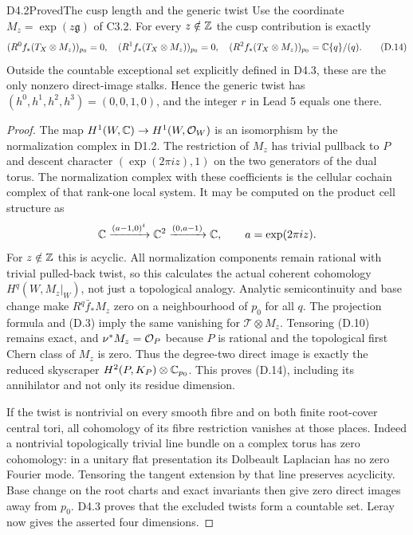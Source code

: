 \begin{claim}{D4.2}{Proved}{The cusp length and the generic twist}
Use the coordinate $M_z=\exp(z\mathfrak g)$ of C3.2. For every
$z\notin\mathbb Z$ the cusp contribution is exactly
\[
 (R^0f_*(T_X\otimes M_z))_{p_0}=0,\quad
 (R^1f_*(T_X\otimes M_z))_{p_0}=0,\quad
 (R^2f_*(T_X\otimes M_z))_{p_0}=\mathbb C\{q\}/(q).           \tag{D.14}
\]
Outside the countable exceptional set explicitly defined in D4.3,
these are the only nonzero direct-image stalks. Hence the generic
twist has $(h^0,h^1,h^2,h^3)=(0,0,1,0)$, and the integer $r$ in
Lead 5 equals one there.
\end{claim}
\begin{proof}
The map $H^1(W,\mathbb C)\to H^1(W,\mathcal O_W)$ is an isomorphism by the
normalization complex in D1.2. The restriction of $M_z$ has trivial
pullback to $P$ and descent character
$(\exp(2\pi iz),1)$ on the two generators of the dual torus. The
normalization complex with these coefficients is the cellular
cochain complex of that rank-one local system. It may be computed
on the product cell structure as
\[
 \mathbb C\xrightarrow{(a-1,0)^t}\mathbb C^2
 \xrightarrow{(0,a-1)}\mathbb C,
 \qquad a=\exp(2\pi iz).
\]
For $z\notin\mathbb Z$ this is acyclic. All normalization components remain
rational with trivial pulled-back twist, so this calculates the
actual coherent cohomology $H^q(W,M_z|_W)$, not just a topological
analogy. Analytic semicontinuity and base change make
$R^q\bar f_*M_z$ zero on a neighbourhood of $p_0$ for all $q$.
The projection formula and (D.3) imply the same vanishing for
$\mathcal T\otimes M_z$. Tensoring (D.10) remains exact, and
$\nu^*M_z=\mathcal O_P$ because $P$ is rational and the topological first
Chern class of $M_z$ is zero. Thus the degree-two direct image is
exactly the reduced skyscraper $H^2(P,K_P)\otimes\mathbb C_{p_0}$.
This proves (D.14), including its annihilator and not only its residue
dimension.

If the twist is nontrivial on every smooth fibre and on both finite
root-cover central tori, all cohomology of its fibre restriction
vanishes at those places. Indeed a nontrivial topologically trivial
line bundle on a complex torus has zero cohomology: in a unitary flat
presentation its Dolbeault Laplacian has no zero Fourier mode.
Tensoring the tangent extension by that line preserves acyclicity.
Base change on the root charts and exact invariants then give zero
direct images away from $p_0$. D4.3 proves that the excluded twists
form a countable set. Leray now gives the asserted four dimensions.
\end{proof}

